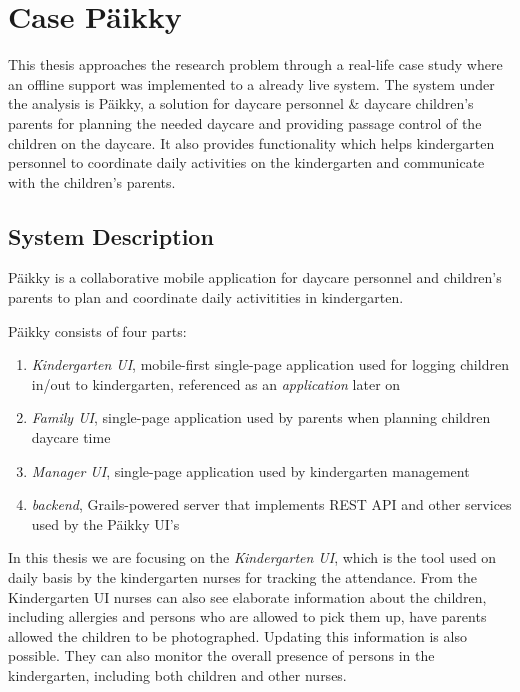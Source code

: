 
\chapter{Case Päikky}
This thesis approaches the research problem through a real-life case study where an offline support was implemented to a already live system. The system under the analysis is Päikky, a solution for daycare personnel & daycare children’s parents for planning the needed daycare and providing passage control of the children on the daycare. It also provides functionality which helps kindergarten personnel to coordinate daily activities on the kindergarten and communicate with the children's parents.


\section{System Description}


Päikky is a collaborative mobile application for daycare personnel and children's parents to plan and coordinate daily activitities in kindergarten. 

Päikky consists of four parts:

\begin{enumerate}
	\item \textit{Kindergarten UI}, mobile-first single-page application used for logging children in/out to kindergarten, referenced as an \textit{application} later on
	\item \textit{Family UI}, single-page application used by parents when planning children daycare time
	\item \textit{Manager UI}, single-page application used by kindergarten management 
	\item \textit{backend}, Grails-powered server that implements REST API and other services used by the Päikky UI's 
\end{enumerate}

\noindent In this thesis we are focusing on the \textit{Kindergarten UI}, which is the tool used on daily basis by the kindergarten nurses for tracking the attendance. From the Kindergarten UI nurses can also see elaborate information about the children, including allergies and persons who are allowed to pick them up, have parents allowed the children to be photographed. Updating this information is also possible. They can also monitor the overall presence of persons in the kindergarten, including both children and other nurses.

